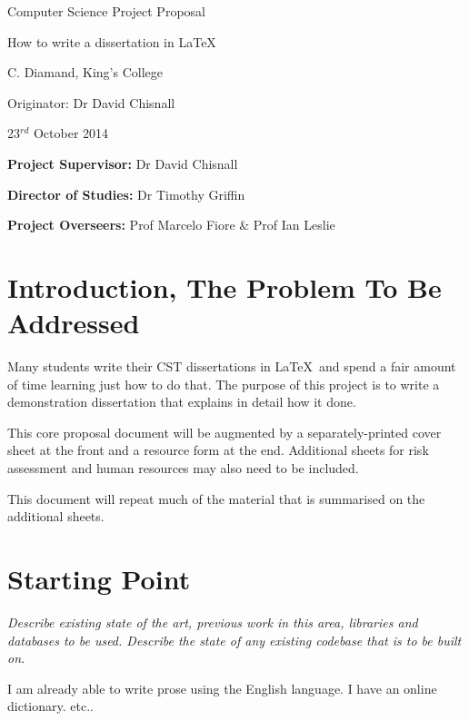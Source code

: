 
\vfil

\centerline{\Large Computer Science Project Proposal}
\vspace{0.4in}
\centerline{\Large How to write a dissertation in \LaTeX\ }
\vspace{0.4in}
\centerline{\large C. Diamand, King's College}
\vspace{0.3in}
\centerline{\large Originator: Dr David Chisnall}
\vspace{0.3in}
\centerline{\large 23$^{rd}$ October 2014}

\vfil

\noindent
{\bf Project Supervisor:} Dr David Chisnall
\vspace{0.2in}

\noindent
{\bf Director of Studies:} Dr Timothy Griffin
\vspace{0.2in}
\noindent

\noindent
{\bf Project Overseers:} Prof Marcelo Fiore \& Prof Ian Leslie


\section*{Introduction, The Problem To Be Addressed}

  Many students write their CST dissertations in \LaTeX\ and spend a fair
  amount of time learning just how to do that. The purpose of this project is
  to write a demonstration dissertation that explains in detail how it done.

  This core proposal document will be augmented by a separately-printed cover
  sheet at the front and a resource form at the end.  Additional sheets for
  risk assessment and human resources may also need to be included.

  This document will repeat much of the material that is summarised on the
  additional sheets.

\section*{Starting Point}

  {\em Describe existing state of the art, previous work in this area,
  libraries and databases to be used.  Describe the state of any existing
  codebase that is to be built on.  }

  I am already able to write prose using the English language. I have an online
  dictionary. etc..

